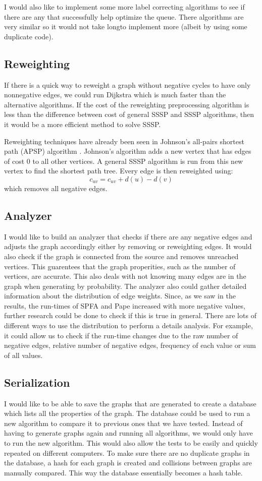\documentclass{article}
\begin{document}
I would also like to implement some more label correcting algorithms to see if there are any that successfully help optimize the queue. There algorithms are very similar so it would not take longto implement more (albeit by using some duplicate code).

\subsection{Reweighting}
If there is a quick way to reweight a graph without negative cycles to have only nonnegative edges, we could run Dijkstra which is much faster than the alternative algorithms. If the cost of the reweighting preprocessing algorithm is less than the difference between cost of general SSSP and SSSP algorithms, then it would be a more efficient method to solve SSSP.

Reweighting techniques have already been seen in Johnson's all-pairs shortest path (APSP) algorithm \cite{Johnson}. Johnson's algorithm adds a new vertex that has edges of cost 0 to all other vertices. A general SSSP algorithm is run from this new vertex to find the shortest path tree. Every edge is then reweighted using:
\[c_{uv} = c_{uv} + d(u) - d(v)\]
which removes all negative edges.

\subsection{Analyzer}
I would like to build an analyzer that checks if there are any negative edges and adjusts the graph accordingly either by removing or reweighting edges. It would also check if the graph is connected from the source and removes unreached vertices. This guarentees that the graph properities, such as the number of vertices, are accurate. This also deals with not knowing many edges are in the graph when generating by probability. The analyzer also could gather detailed information about the distribution of edge weights. Since, as we saw in the results, the run-times of SPFA and Pape increased with more negative values, further research could be done to check if this is true in general. There are lots of different ways to use the distribution to perform a details analysis. For example, it could allow us to check if the run-time changes due to the raw number of negative edges, relative number of negative edges, frequency of each value or sum of all values.

\subsection{Serialization}
I would like to be able to save the graphs that are generated to create a database which lists all the properties of the graph. The database could be used to run a new algorithm to compare it to previous ones that we have tested. Instead of having to generate graphs again and running all algorithms, we would only have to run the new algorithm. This would also allow the tests to be easily and quickly repeated on different computers. 
To make sure there are no duplicate graphs in the database, a hash for each graph is created and collisions between graphs are manually compared. This way the database essentially becomes a hash table.
\end{document}
